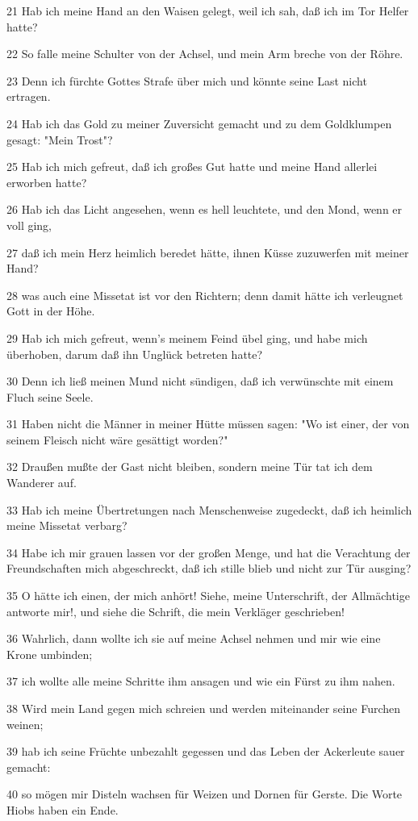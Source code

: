 \par 21 Hab ich meine Hand an den Waisen gelegt, weil ich sah, daß ich im Tor Helfer hatte?
\par 22 So falle meine Schulter von der Achsel, und mein Arm breche von der Röhre.
\par 23 Denn ich fürchte Gottes Strafe über mich und könnte seine Last nicht ertragen.
\par 24 Hab ich das Gold zu meiner Zuversicht gemacht und zu dem Goldklumpen gesagt: "Mein Trost"?
\par 25 Hab ich mich gefreut, daß ich großes Gut hatte und meine Hand allerlei erworben hatte?
\par 26 Hab ich das Licht angesehen, wenn es hell leuchtete, und den Mond, wenn er voll ging,
\par 27 daß ich mein Herz heimlich beredet hätte, ihnen Küsse zuzuwerfen mit meiner Hand?
\par 28 was auch eine Missetat ist vor den Richtern; denn damit hätte ich verleugnet Gott in der Höhe.
\par 29 Hab ich mich gefreut, wenn's meinem Feind übel ging, und habe mich überhoben, darum daß ihn Unglück betreten hatte?
\par 30 Denn ich ließ meinen Mund nicht sündigen, daß ich verwünschte mit einem Fluch seine Seele.
\par 31 Haben nicht die Männer in meiner Hütte müssen sagen: "Wo ist einer, der von seinem Fleisch nicht wäre gesättigt worden?"
\par 32 Draußen mußte der Gast nicht bleiben, sondern meine Tür tat ich dem Wanderer auf.
\par 33 Hab ich meine Übertretungen nach Menschenweise zugedeckt, daß ich heimlich meine Missetat verbarg?
\par 34 Habe ich mir grauen lassen vor der großen Menge, und hat die Verachtung der Freundschaften mich abgeschreckt, daß ich stille blieb und nicht zur Tür ausging?
\par 35 O hätte ich einen, der mich anhört! Siehe, meine Unterschrift, der Allmächtige antworte mir!, und siehe die Schrift, die mein Verkläger geschrieben!
\par 36 Wahrlich, dann wollte ich sie auf meine Achsel nehmen und mir wie eine Krone umbinden;
\par 37 ich wollte alle meine Schritte ihm ansagen und wie ein Fürst zu ihm nahen.
\par 38 Wird mein Land gegen mich schreien und werden miteinander seine Furchen weinen;
\par 39 hab ich seine Früchte unbezahlt gegessen und das Leben der Ackerleute sauer gemacht:
\par 40 so mögen mir Disteln wachsen für Weizen und Dornen für Gerste. Die Worte Hiobs haben ein Ende.

